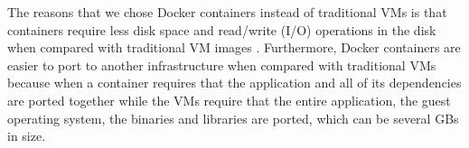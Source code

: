 The reasons that we chose Docker containers instead of traditional \glspl{VM} is that containers
require less disk space and read/write (I/O) operations in the disk when compared with traditional
\gls{VM} images \cite{merkel2014docker}. Furthermore, Docker containers are easier to port to another
infrastructure when compared with traditional \glspl{VM} because when a container requires that the
application and all of its dependencies are ported together while the \glspl{VM} require that the
entire application, the guest operating system, the binaries and libraries are ported, which can be
several \glspl{GB} in size.

